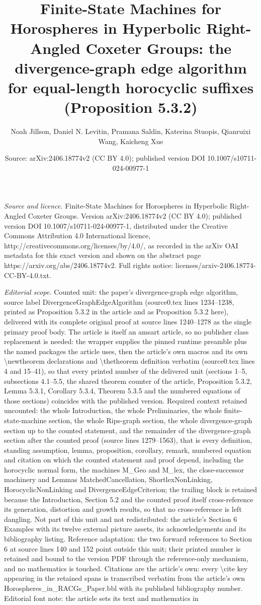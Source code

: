 \documentclass[10pt,a4paper]{amsart}
\title[Finite-State Machines for Horospheres in Hyperbolic Right-An]{Finite-State Machines for Horospheres in Hyperbolic Right-Angled Coxeter Groups: the divergence-graph edge algorithm for equal-length horocyclic suffixes (Proposition 5.3.2)}
\author{Noah Jillson, Daniel N. Levitin, Pramana Saldin, Katerina Stuopis, Qianruixi Wang, Kaicheng Xue}
\date{Source: arXiv:2406.18774v2 (CC BY 4.0); published version DOI 10.1007/s10711-024-00977-1}
\theoremstyle{definition}
\theoremstyle{remark}
\begin{document}
\maketitle
\noindent\emph{Source and licence.} Finite-State Machines for Horospheres in Hyperbolic Right-Angled Coxeter Groups. Version arXiv:2406.18774v2 (CC BY 4.0); published version DOI 10.1007/s10711-024-00977-1, distributed under the Creative Commons Attribution 4.0 International licence, http://creativecommons.org/licenses/by/4.0/, as recorded in the arXiv OAI metadata for this exact version and shown on the abstract page https://arxiv.org/abs/2406.18774v2. Full rights notice: licenses/arxiv-2406.18774-CC-BY-4.0.txt.\par\smallskip
\noindent\textit{Editorial scope.} Counted unit: the paper's divergence-graph edge algorithm, source label DivergenceGraphEdgeAlgorithm (source0.tex lines 1234--1238, printed as Proposition 5.3.2 in the article and as Proposition 5.3.2 here), delivered with its complete original proof at source lines 1240--1278 as the single primary proof body. The article is itself an amsart article, so no publisher class replacement is needed: the wrapper supplies the pinned runtime preamble plus the named packages the article uses, then the article's own macros and its own \textbackslash{}newtheorem declarations and \textbackslash{}thetheorem definition verbatim (source0.tex lines 4 and 15--41), so that every printed number of the delivered unit (sections 1--5, subsections 4.1--5.5, the shared theorem counter of the article, Proposition 5.3.2, Lemma 5.3.1, Corollary 5.3.4, Theorem 5.3.5 and the numbered equations of those sections) coincides with the published version. Required context retained uncounted: the whole Introduction, the whole Preliminaries, the whole finite-state-machine section, the whole Rips-graph section, the whole divergence-graph section up to the counted statement, and the remainder of the divergence-graph section after the counted proof (source lines 1279--1563), that is every definition, standing assumption, lemma, proposition, corollary, remark, numbered equation and citation on which the counted statement and proof depend, including the horocyclic normal form, the machines M\_Geo and M\_lex, the close-successor machinery and Lemmas MatchedCancellation, ShortlexNonLinking, HorocyclicNonLinking and DivergenceEdgeCriterion; the trailing block is retained because the Introduction, Section 5.2 and the counted proof itself cross-reference its generation, distortion and growth results, so that no cross-reference is left dangling. Not part of this unit and not redistributed: the article's Section 6 Examples with its twelve external picture assets, its acknowledgements and its bibliography listing. Reference adaptation: the two forward references to Section 6 at source lines 140 and 152 point outside this unit; their printed number is retained and bound to the version PDF through the reference-only mechanism, and no mathematics is touched. Citations are the article's own: every \textbackslash{}cite key appearing in the retained spans is transcribed verbatim from the article's own Horospheres\_in\_RACGs\_Paper.bbl with its published bibliography number. Editorial font note: the article sets its text and mathematics in 
\end{document}
